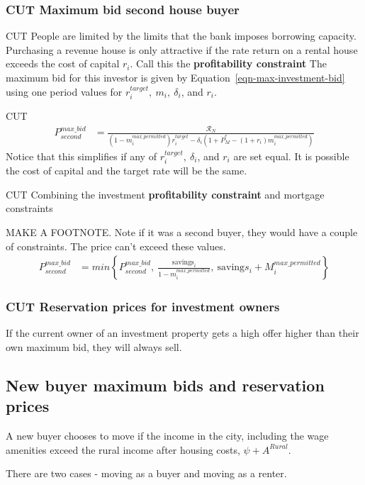 {{\subsubsection{CUT Maximum bid second house buyer}

CUT People are limited by the limits  that the bank imposes borrowing capacity. Purchasing a revenue house is only attractive if the rate return on a rental house exceeds the cost of capital $r_i$. Call this the \textbf{profitability constraint} The maximum bid for this investor is given by Equation~\ref{eqn-max-investment-bid} using one period values for $r_i^{target},\ m_i,\ \delta_i$, and $r_i$.

CUT \begin{eqnarray}\label{eqn-max-second-bid}
P_{second}^{max\_bid} & = \frac{\mathcal{R}_N}{(1-m_i^{max\_permitted})r_i^{target}-\delta_i \left(1 + \dot P_M^e - (1+r_i)m_i^{max\_permitted}\right)} 
\end{eqnarray}
Notice that this simplifies if any of $r_i^{target},\ \delta_i$, and $r_i$ are set equal. It is possible the cost of capital and the target rate will be the same.

CUT Combining the investment \textbf{profitability constraint} and mortgage constraints


MAKE A FOOTNOTE. Note if it was a second buyer, they would have a couple of constraints. The price can't exceed these values.
\begin{eqnarray}
P_{second}^{max\_bid} & = min \left\{P_{second}^{max\_bid},\ \frac{\mathrm{savings}_i}{1-m_i^{max\_permitted}},\ \mathrm{saving}s_i + M_i^{max\_permitted}  \right\}  \nonumber
\end{eqnarray}

\subsubsection{CUT Reservation prices for investment owners}
If the current owner of an investment  property gets a high offer higher than their own maximum bid, they will always sell.  


\subsection{New buyer maximum bids and reservation prices }
A new buyer chooses to move if the income in the city, including the wage amenities exceed the rural income after housing costs, $\psi+A^{Rural}$. 

There are two cases - moving as a buyer and moving as a renter.

}}
